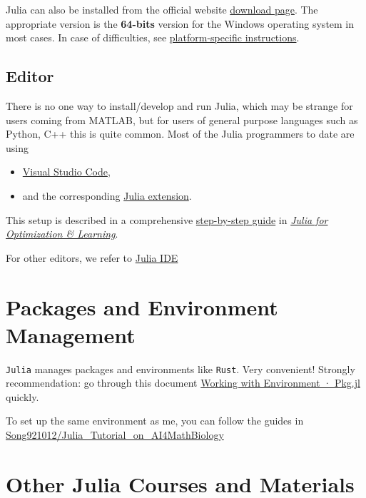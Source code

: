 \documentclass[
  letterpaper,
  DIV=11,
  numbers=noendperiod]{scrreport}
\providecommand{\tightlist}{%
  \setlength{\itemsep}{0pt}\setlength{\parskip}{0pt}}\usepackage{longtable,booktabs,array}
\begin{document}
Julia can also be installed from the official website
\href{https://julialang.org/downloads/}{download page}. The appropriate
version is the \textbf{64-bits} version for the Windows operating system
in most cases. In case of difficulties, see
\href{https://julialang.org/downloads/platform/}{platform-specific
instructions}.

\subsection{Editor}\label{editor}

There is no one way to install/develop and run Julia, which may be
strange for users coming from MATLAB, but for users of general purpose
languages such as Python, C++ this is quite common. Most of the Julia
programmers to date are using

\begin{itemize}
\tightlist
\item
  \href{https://code.visualstudio.com/}{Visual Studio Code},
\item
  and the corresponding \href{https://www.julia-vscode.org/}{Julia
  extension}.
\end{itemize}

This setup is described in a comprehensive
\href{https://juliateachingctu.github.io/Julia-for-Optimization-and\%20Learning/stable/installation/vscode/}{step-by-step
guide} in
\href{https://juliateachingctu.github.io/Julia-for-Optimization-and-Learning/stable/}{\emph{Julia
for Optimization \& Learning}}.

For other editors, we refer to \href{https://julialang.org/}{Julia IDE}

\section{Packages and Environment
Management}\label{packages-and-environment-management}

\texttt{Julia} manages packages and environments like \texttt{Rust}.
Very convenient! Strongly recommendation: go through this document
\href{https://pkgdocs.julialang.org/v1/environments/\#Working-with-Environments}{Working
with Environment · Pkg.jl} quickly.

To set up the same environment as me, you can follow the guides in
\href{https://github.com/Song921012/Julia_Tutorial_on_AI4MathBiology}{Song921012/Julia\_Tutorial\_on\_AI4MathBiology}

\section{Other Julia Courses and
Materials}\label{other-julia-courses-and-materials}
\end{document}
